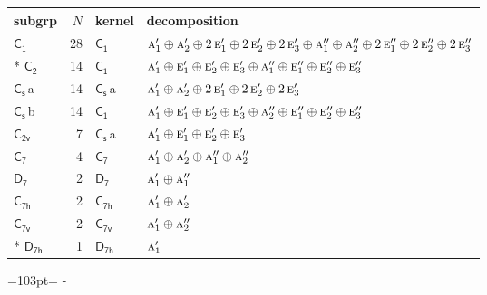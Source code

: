 \documentclass[10pt,a4paper]{article}
\newcommand{\needspace}[1]{\par\penalty-100\begingroup\dimen0=#1\relax\dimen2=\pagegoal
  \advance\dimen2-\pagetotal\ifdim\dimen0>\dimen2\relax\ifdim\dimen2>0pt\vfil\break\fi\fi
  \endgroup}
\numberwithin{equation}{section}
\newcommand{\grp}[1]{\mathsf{#1}}
\newcommand{\irr}[1]{\text{\normalfont\scshape #1}}
\newcommand{\clsletter}[1]{\,{\scriptsize\color{black!55}#1}}
\newlength{\fillwidth}\newlength{\cellwidth}\newlength{\colwidth}
\begin{document}
{\begin{longtable}{@{}lrl>{\RaggedRight\arraybackslash}p{\fillwidth}@{}}
subgrp & $N$ & kernel & decomposition\\\midrule\endhead
\bottomrule\endfoot\endlastfoot
\href{C1.pdf}{$\grp{C_{1}}$} & 28 & \href{C1.pdf}{$\grp{C_{1}}$} & $\irr{a}_{1}'\oplus \irr{a}_{2}'\oplus 2\,\irr{e}_{1}'\oplus 2\,\irr{e}_{2}'\oplus 2\,\irr{e}_{3}'\oplus \irr{a}_{1}''\oplus \irr{a}_{2}''\oplus 2\,\irr{e}_{1}''\oplus 2\,\irr{e}_{2}''\oplus 2\,\irr{e}_{3}''$\\*
\href{C2.pdf}{$\grp{C_{2}}$} & 14 & \href{C1.pdf}{$\grp{C_{1}}$} & $\irr{a}_{1}'\oplus \irr{e}_{1}'\oplus \irr{e}_{2}'\oplus \irr{e}_{3}'\oplus \irr{a}_{1}''\oplus \irr{e}_{1}''\oplus \irr{e}_{2}''\oplus \irr{e}_{3}''$\\
\href{C1v.pdf}{$\grp{C_{s}}$}\clsletter{a} & 14 & \href{C1v.pdf}{$\grp{C_{s}}$}\clsletter{a} & $\irr{a}_{1}'\oplus \irr{a}_{2}'\oplus 2\,\irr{e}_{1}'\oplus 2\,\irr{e}_{2}'\oplus 2\,\irr{e}_{3}'$\\
\href{C1v.pdf}{$\grp{C_{s}}$}\clsletter{b} & 14 & \href{C1.pdf}{$\grp{C_{1}}$} & $\irr{a}_{1}'\oplus \irr{e}_{1}'\oplus \irr{e}_{2}'\oplus \irr{e}_{3}'\oplus \irr{a}_{2}''\oplus \irr{e}_{1}''\oplus \irr{e}_{2}''\oplus \irr{e}_{3}''$\\
\href{C2v.pdf}{$\grp{C_{2v}}$} & 7 & \href{C1v.pdf}{$\grp{C_{s}}$}\clsletter{a} & $\irr{a}_{1}'\oplus \irr{e}_{1}'\oplus \irr{e}_{2}'\oplus \irr{e}_{3}'$\\
\href{C7.pdf}{$\grp{C_{7}}$} & 4 & \href{C7.pdf}{$\grp{C_{7}}$} & $\irr{a}_{1}'\oplus \irr{a}_{2}'\oplus \irr{a}_{1}''\oplus \irr{a}_{2}''$\\
\href{D7.pdf}{$\grp{D_{7}}$} & 2 & \href{D7.pdf}{$\grp{D_{7}}$} & $\irr{a}_{1}'\oplus \irr{a}_{1}''$\\
\href{C7h.pdf}{$\grp{C_{7h}}$} & 2 & \href{C7h.pdf}{$\grp{C_{7h}}$} & $\irr{a}_{1}'\oplus \irr{a}_{2}'$\\
\href{C7v.pdf}{$\grp{C_{7v}}$} & 2 & \href{C7v.pdf}{$\grp{C_{7v}}$} & $\irr{a}_{1}'\oplus \irr{a}_{2}''$\\*
\href{D7h.pdf}{$\grp{D_{7h}}$} & 1 & \href{D7h.pdf}{$\grp{D_{7h}}$} & $\irr{a}_{1}'$\\
\bottomrule\end{longtable}}
\needspace{103pt}
\end{document}
